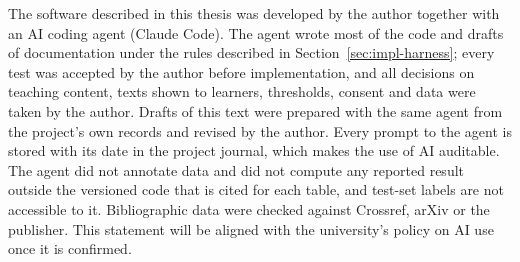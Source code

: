 The software described in this thesis was developed by the author together with an AI coding agent
(Claude Code). The agent wrote most of the code and drafts of documentation under the rules described in
Section~\ref{sec:impl-harness}; every test was accepted by the author before implementation, and all
decisions on teaching content, texts shown to learners, thresholds, consent and data were taken by the
author. Drafts of this text were prepared with the same agent from the project's own records and revised
by the author. Every prompt to the agent is stored with its date in the project journal, which makes the
use of AI auditable. The agent did not annotate data and did not compute any reported result outside the
versioned code that is cited for each table, and test-set labels are not accessible to it. Bibliographic data were checked against Crossref, arXiv or
the publisher. This statement will be aligned with the university's policy on AI use once it is
confirmed.
